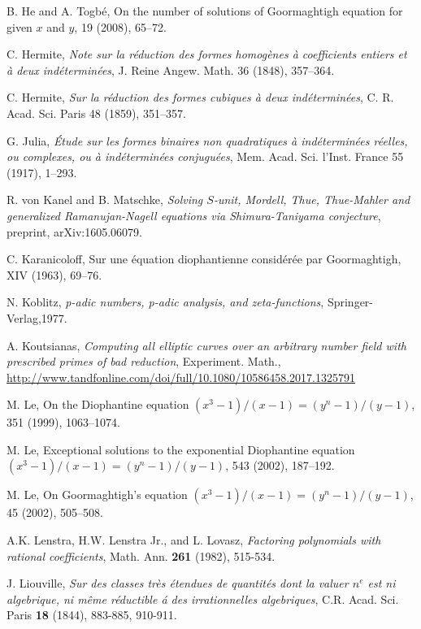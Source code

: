 \begin{thebibliography}{}
B. He and A. Togb\'e,
\newblock On the number of solutions of Goormaghtigh equation for given $x$ and $y$,
 19 (2008), 65--72.

C. Hermite,
\emph{Note sur la r\'eduction des formes homog\`enes \`a 
coefficients entiers et  \`a deux ind\'etermin\'ees},
J. Reine Angew. Math. 36 (1848), 357--364.

C. Hermite,
\emph{Sur la r\'eduction des formes cubiques \`a deux ind\'etermin\'ees},
C. R. Acad. Sci. Paris 48 (1859), 351--357.

G. Julia,
\emph{\'Etude sur les formes binaires non quadratiques \`a ind\'etermin\'ees r\'eelles, ou complexes, ou \`a 
ind\'etermin\'ees conjugu\'ees},
Mem. Acad. Sci. l'Inst. France 55 (1917), 1--293.

R. von Kanel and B. Matschke,
\emph{Solving $S$-unit, Mordell, Thue, Thue-Mahler and generalized Ramanujan-Nagell equations via Shimura-Taniyama conjecture}, 
preprint, arXiv:1605.06079.

C. Karanicoloff,
\newblock Sur une \'equation diophantienne consid\'er\'ee par Goormaghtigh,
 XIV (1963), 69--76.

N. Koblitz, 
\emph{p-adic numbers, p-adic analysis, and zeta-functions}, 
Springer-Verlag,1977.

A. Koutsianas,
\emph{Computing all elliptic curves over an arbitrary number field with prescribed primes of bad reduction}, 
Experiment. Math., \url{http://www.tandfonline.com/doi/full/10.1080/10586458.2017.1325791}

M. Le,
\newblock On the Diophantine equation $(x^3-1)/(x-1)=(y^n-1)/(y-1)$,
 351 (1999), 1063--1074.

M. Le,
\newblock Exceptional solutions to the exponential Diophantine equation $(x^3-1)/(x-1)=(y^n-1)/(y-1)$,
  543 (2002), 187--192.

M. Le,
\newblock On Goormaghtigh's equation $(x^3-1)/(x-1)=(y^n-1)/(y-1)$,
 45 (2002), 505--508.

A.K. Lenstra, H.W. Lenstra Jr., and L. Lovasz, 
\emph{Factoring polynomials with rational coefficients}, 
Math. Ann. \textbf{261} (1982), 515-534.

J. Liouville,
\emph{Sur des classes tr\`es \'etendues de quantit\'es dont la valuer $n^e$ est ni algebrique, ni m\^eme r\'eductible \'a des irrationnelles algebriques},
C.R. Acad. Sci. Paris \textbf{18} (1844), 883-885, 910-911.


\end{thebibliography}
